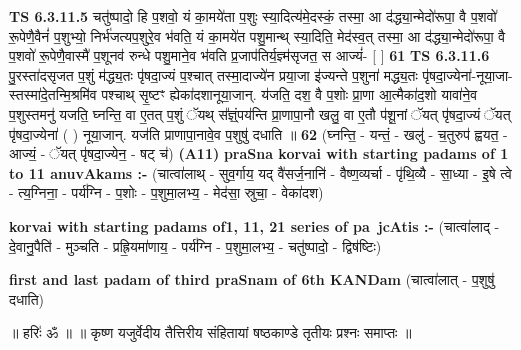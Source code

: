 \documentclass[17pt]{extarticle}
\begin{document}
                  \newline
                                \textbf{ TS 6.3.11.5} \newline
                  चतु॑ष्पादो॒ हि प॒शवो॒ यं का॒मये॑ता प॒शुः स्या॒दित्य॑मे॒दस्कं॒ तस्मा॒ आ द॑द्ध्या॒न्मेदो॑रूपा॒ वै प॒शवो॑ रू॒पेणै॒वैनं॑ प॒शुभ्यो॒ निर्भ॑जत्यप॒शुरे॒व भ॑वति॒ यं का॒मये॑त पशु॒मान्थ् स्या॒दिति॒ मेद॑स्व॒त् तस्मा॒ आ द॑द्ध्या॒न्मेदो॑रूपा॒ वै प॒शवो॑ रू॒पेणै॒वास्मै॑ प॒शूनव॑ रुन्धे पशु॒माने॒व भ॑वति प्र॒जाप॑तिर्य॒ज्ञ्म॑सृजत॒ स आज्यं॑- [  ] \textbf{  61} \newline
                  \newline
                                \textbf{ TS 6.3.11.6} \newline
                  पु॒रस्ता॑दसृजत प॒शुं म॑द्ध्य॒तः पृ॑षदा॒ज्यं प॒श्चात् तस्मा॒दाज्ये॑न प्रया॒जा इ॑ज्यन्ते प॒शुना॑ मद्ध्य॒तः पृ॑षदा॒ज्येना॑-नूया॒जा-स्तस्मा॑दे॒तन्मि॒श्रमि॑व पश्चाथ् सृ॒ष्टꣳ ह्येका॑दशानूया॒जान्. य॑जति॒ दश॒ वै प॒शोः प्रा॒णा आ॒त्मैका॑द॒शो यावा॑ने॒व प॒शुस्तमनु॑ यजति॒ घ्नन्ति॒ वा ए॒तत् प॒शुं ॅयथ् स᳚ज्ञ्ं॒पय॑न्ति प्रा॒णापा॒नौ खलु॒ वा ए॒तौ प॑शू॒नां ॅयत् पृ॑षदा॒ज्यं ॅयत् पृ॑षदा॒ज्येना॑ ( ) नूया॒जान्. यज॑ति प्राणापा॒नावे॒व प॒शुषु॑ दधाति ॥ \textbf{  62 } \newline
                  \newline
                      (घ्नन्ति॒ - यन्तं॒ - खलु॑ - च॒तुरुप॑ ह्वयत॒ - आज्यं॒ - ॅयत् पृ॑षदा॒ज्येन॒ - षट् च॑)  \textbf{(A11)} \newline \newline
                \textbf{praSna korvai with starting padams of 1 to 11 anuvAkams :-} \newline
        (चात्वा॑लाथ् - सुव॒र्गाय॒ यद् वै॑सर्ज॒नानि॑ - वैष्ण॒व्यर्चा - पृ॑थि॒व्यै - सा॒ध्या - इ॒षे त्वे - त्य॒ग्निना॒ - पर्य॑ग्नि - प॒शोः - प॒शुमा॒लभ्य॒ - मेद॑सा॒ स्रुचा॒ - वेका॑दश) \newline

        \textbf{korvai with starting padams of1, 11, 21 series of pa~jcAtis :-} \newline
        (चात्वा॑लाद् - दे॒वानु॒पैति॑ - मुञ्चति - प्रह्रि॒यमा॑णाय॒ - पर्य॑ग्नि - प॒शुमा॒लभ्य॒ - चतु॑ष्पादो॒ - द्विष॑ष्टिः) \newline

        \textbf{first and last padam of third praSnam of 6th KANDam} \newline
        (चात्वा॑लात् - प॒शुषु॑ दधाति) \newline 

        
        ॥ हरिः॑ ॐ ॥
॥ कृष्ण यजुर्वेदीय तैत्तिरीय संहितायां षष्ठकाण्डे तृतीयः प्रश्नः समाप्तः ॥ \newline
        \pagebreak
                \pagebreak
        
\end{document}
